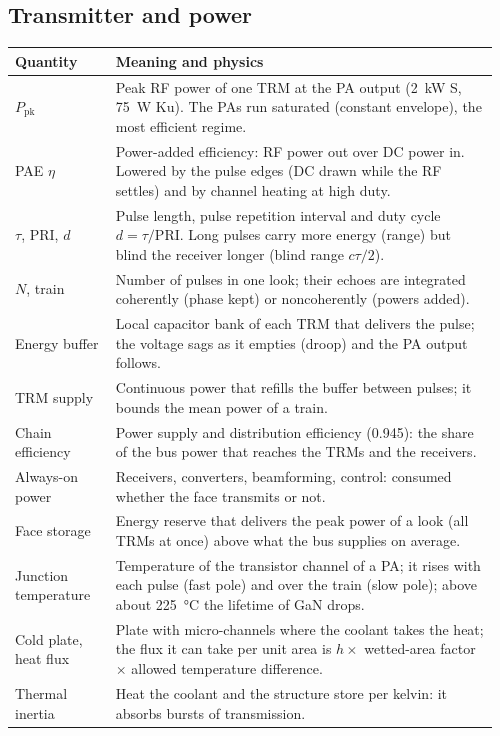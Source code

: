 \documentclass[11pt,a4paper]{article}
\begin{document}
\subsection{Transmitter and power}
{\small
\begin{longtable}{@{}p{0.2\linewidth}p{0.76\linewidth}@{}}
\toprule
Quantity & Meaning and physics\\
\midrule
\endhead
$P_{\mathrm{pk}}$ & Peak RF power of one TRM at the PA output (\SI{2}{kW} S, \SI{75}{W} Ku). The PAs run saturated
(constant envelope), the most efficient regime.\\
PAE $\eta$ & Power-added efficiency: RF power out over DC power in. Lowered by the pulse edges (DC drawn while the RF
settles) and by channel heating at high duty.\\
$\tau$, PRI, $d$ & Pulse length, pulse repetition interval and duty cycle $d = \tau/\mathrm{PRI}$. Long pulses carry more
energy (range) but blind the receiver longer (blind range $c\tau/2$).\\
$N$, train & Number of pulses in one look; their echoes are integrated coherently (phase kept) or noncoherently
(powers added).\\
Energy buffer & Local capacitor bank of each TRM that delivers the pulse; the voltage sags as it empties (droop) and
the PA output follows.\\
TRM supply & Continuous power that refills the buffer between pulses; it bounds the mean power of a train.\\
Chain efficiency & Power supply and distribution efficiency (0.945): the share of the bus power that reaches the TRMs
and the receivers.\\
Always-on power & Receivers, converters, beamforming, control: consumed whether the face transmits or not.\\
Face storage & Energy reserve that delivers the peak power of a look (all TRMs at once) above what the bus supplies on
average.\\
Junction temperature & Temperature of the transistor channel of a PA; it rises with each pulse (fast pole) and over the
train (slow pole); above about \SI{225}{\celsius} the lifetime of GaN drops.\\
Cold plate, heat flux & Plate with micro-channels where the coolant takes the heat; the flux it can take per unit area
is $h \times$ wetted-area factor $\times$ allowed temperature difference.\\
Thermal inertia & Heat the coolant and the structure store per kelvin: it absorbs bursts of transmission.\\

\end{longtable}}
\end{document}
